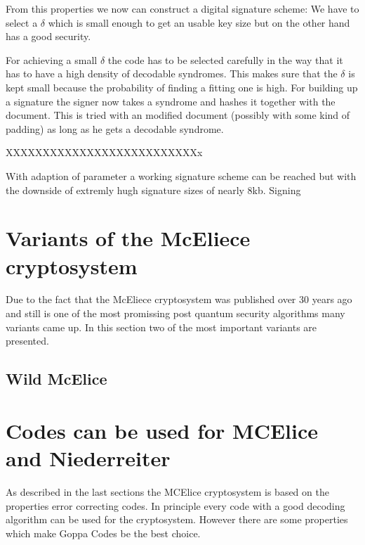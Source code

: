 From this properties we now can construct a digital signature scheme: We have to select a $\delta$ which is small enough to get an usable key size but on the other hand has a good security. 

For achieving a small $\delta$ the code has to be selected carefully in the way that it has to have a high density of decodable syndromes. This makes sure that the $\delta$ is kept small because the probability of finding a fitting one is high. For building up a signature the signer now takes a syndrome and hashes it together with the document. This is tried with an modified document (possibly with some kind of padding) as long as he gets a decodable syndrome. \cite{courtois2001achieve}


XXXXXXXXXXXXXXXXXXXXXXXXXXx

With adaption of parameter a working signature scheme can be reached but with the downside of extremly hugh signature sizes of nearly 8kb. 
Signing

\section{Variants of the McEliece cryptosystem}
Due to the fact that the McEliece cryptosystem was published over 30 years ago and still is one of the most promissing post quantum security algorithms many variants came up. In this section two of the most important variants are presented. 
 

\subsection{Wild McElice}




\section{Codes can be used for MCElice and Niederreiter} 
As described in the last sections the MCElice cryptosystem is based on the properties error correcting codes. In principle every code with a good decoding algorithm can be used for the cryptosystem. However there are some properties which make Goppa Codes be the best choice.

